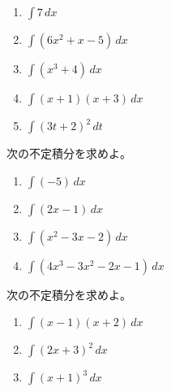 \begin{multicols*}{4}
 \begin{enumerate}
  \item $\displaystyle\int 7\,dx$
	\begin{ansBlockSize}{8}
	\end{ansBlockSize}
  \item $\displaystyle\int (6x^2+x-5)\,dx$
	\begin{ansBlockSize}{8}
	\end{ansBlockSize}
  \item $\displaystyle\int (x^3+4)\,dx$
	\begin{ansBlockSize}{8}
	\end{ansBlockSize}
  \item $\displaystyle\int (x+1)(x+3)\,dx$
	\begin{ansBlockSize}{12}
	\end{ansBlockSize}
  \item $\displaystyle\int (3t+2)^2\,dt$
	\begin{ansBlockSize}{12}
	\end{ansBlockSize}
 \end{enumerate}

 次の不定積分を求めよ。
 
 \begin{enumerate}
  \item $\displaystyle\int (-5)\,dx$
	\begin{ansBlockSize}{8}
	\end{ansBlockSize}
  \item $\displaystyle\int (2x-1)\,dx$
	\begin{ansBlockSize}{8}
	\end{ansBlockSize}
  \item $\displaystyle\int (x^2-3x-2)\,dx$
	\begin{ansBlockSize}{8}
	\end{ansBlockSize}
  \item $\displaystyle\int (4x^3-3x^2-2x-1)\,dx$
	\begin{ansBlockSize}{8}
	\end{ansBlockSize}
 \end{enumerate}

 次の不定積分を求めよ。
 
 \begin{enumerate}
  \item $\displaystyle\int (x-1)(x+2)\,dx$
	\begin{ansBlockSize}{12}
	\end{ansBlockSize}
  \item $\displaystyle\int (2x+3)^2\,dx$
	\begin{ansBlockSize}{12}
	\end{ansBlockSize}
  \item $\displaystyle\int (x+1)^3\,dx$
	\begin{ansBlockSize}{12}
	\end{ansBlockSize}
 \end{enumerate}
\end{multicols*}


